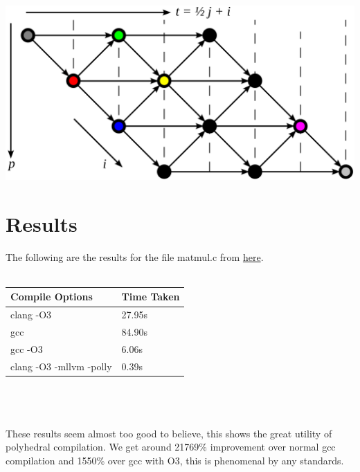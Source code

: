 \documentclass[a4paper,12pt]{report}
\begin{document}
\begin{center}
\includegraphics[scale=0.13]{polyf.png}
\end{center}
\newpage
\section{Results}
The following are the results for the file matmul.c from \href{https://raw.githubusercontent.com/llvm-mirror/polly/master/docs/experiments/matmul/matmul.c}{here}. \\\\
\begin{tabular}{|l|l|}
\hline
Compile Options & Time Taken \\ \hline
clang -O3 & 27.95s \\ \hline
gcc & 84.90s \\ \hline
gcc -O3 & 6.06s \\ \hline
clang -O3 -mllvm -polly & 0.39s \\ \hline
\end{tabular}\\\\\\
These results seem almost too good to believe, this shows the great utility of polyhedral compilation. We get around 21769\% improvement over normal gcc compilation and 1550\% over gcc with O3, this is phenomenal by any standards.  
\end{document}
